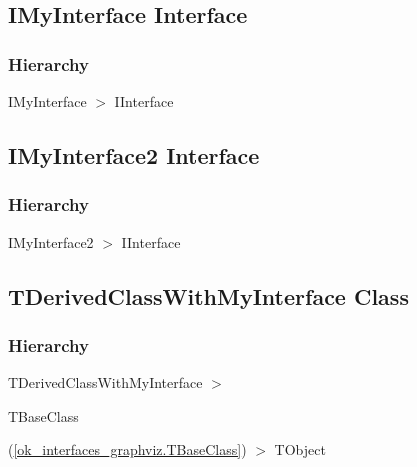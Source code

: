 \documentclass{report}
\newif\ifpdf
\begin{document}
\subsection*{IMyInterface Interface}
\fi
\label{ok_interfaces_graphviz.IMyInterface}
\subsubsection*{\large{\textbf{Hierarchy}}\normalsize\hspace{1ex}\hfill}
IMyInterface {$>$} IInterface
\ifpdf
\subsection*{\large{\textbf{IMyInterface2 Interface}}\normalsize\hspace{1ex}\hrulefill}
\else
\subsection*{IMyInterface2 Interface}
\fi
\label{ok_interfaces_graphviz.IMyInterface2}
\subsubsection*{\large{\textbf{Hierarchy}}\normalsize\hspace{1ex}\hfill}
IMyInterface2 {$>$} IInterface
\ifpdf
\subsection*{\large{\textbf{TDerivedClassWithMyInterface Class}}\normalsize\hspace{1ex}\hrulefill}
\else
\subsection*{TDerivedClassWithMyInterface Class}
\fi
\label{ok_interfaces_graphviz.TDerivedClassWithMyInterface}
\subsubsection*{\large{\textbf{Hierarchy}}\normalsize\hspace{1ex}\hfill}
TDerivedClassWithMyInterface {$>$} \begin{ttfamily}TBaseClass\end{ttfamily}(\ref{ok_interfaces_graphviz.TBaseClass}) {$>$} 
TObject
\ifpdf
\end{document}
